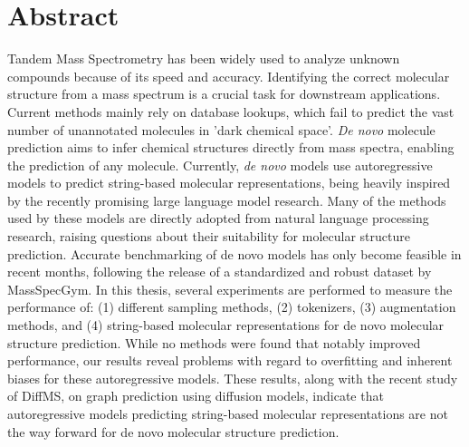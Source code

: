 \chapter{Abstract}
\label{chap:abstract}

Tandem Mass Spectrometry has been widely used to analyze unknown compounds because of its speed and accuracy.
Identifying the correct molecular structure from a mass spectrum is a crucial task for downstream applications.
Current methods mainly rely on database lookups, which fail to predict the vast number of unannotated molecules in 'dark chemical space'.
\textit{De novo} molecule prediction aims to infer chemical structures directly from mass spectra, enabling the prediction of any molecule.
Currently, \textit{de novo} models use autoregressive models to predict string-based molecular representations, being heavily inspired by the recently promising large language model research.
Many of the methods used by these models are directly adopted from natural language processing research, raising questions about their suitability for molecular structure prediction.
Accurate benchmarking of de novo models has only become feasible in recent months, following the release of a standardized and robust dataset by MassSpecGym.
In this thesis, several experiments are performed to measure the performance of: (1) different sampling methods, (2) tokenizers, (3) augmentation methods, and (4) string-based molecular representations for de novo molecular structure prediction.
While no methods were found that notably improved performance, our results reveal problems with regard to overfitting and inherent biases for these autoregressive models.
These results, along with the recent study of DiffMS, on graph prediction using diffusion models, indicate that autoregressive models predicting string-based molecular representations are not the way forward for de novo molecular structure prediction.
